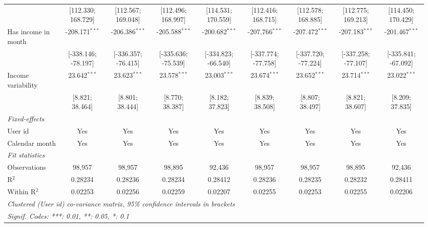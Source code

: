\begin{table}[htbp]
\begin{threeparttable}[b]
\begin{tabular}{lcccccccc}
                                          & [112.330; 168.729]  & [112.567; 169.048]  & [112.496; 168.997]  & [114.531; 170.559]  & [112.416; 168.715]  & [112.578; 168.885]  & [112.775; 169.213]  & [114.450; 170.429]\\   
         Has income in month              & -208.171$^{***}$    & -206.386$^{***}$    & -205.588$^{***}$    & -200.682$^{***}$    & -207.766$^{***}$    & -207.472$^{***}$    & -207.183$^{***}$    & -201.467$^{***}$\\   
                                          & [-338.146; -78.197] & [-336.357; -76.415] & [-335.636; -75.539] & [-334.823; -66.540] & [-337.774; -77.758] & [-337.720; -77.224] & [-337.258; -77.107] & [-335.841; -67.092]\\   
         Income variability               & 23.642$^{***}$      & 23.623$^{***}$      & 23.578$^{***}$      & 23.003$^{***}$      & 23.674$^{***}$      & 23.652$^{***}$      & 23.714$^{***}$      & 23.022$^{***}$\\   
                                          & [8.821; 38.464]     & [8.801; 38.444]     & [8.770; 38.387]     & [8.182; 37.823]     & [8.839; 38.508]     & [8.807; 38.497]     & [8.821; 38.607]     & [8.209; 37.835]\\   
         \midrule
         \emph{Fixed-effects}\\
         User id                          & Yes                 & Yes                 & Yes                 & Yes                 & Yes                 & Yes                 & Yes                 & Yes\\  
         Calendar month                   & Yes                 & Yes                 & Yes                 & Yes                 & Yes                 & Yes                 & Yes                 & Yes\\  
         \midrule
         \emph{Fit statistics}\\
         Observations                     & 98,957              & 98,957              & 98,895              & 92,436              & 98,957              & 98,957              & 98,895              & 92,436\\  
         R$^2$                            & 0.28234             & 0.28236             & 0.28234             & 0.28412             & 0.28236             & 0.28235             & 0.28232             & 0.28411\\  
         Within R$^2$                     & 0.02253             & 0.02256             & 0.02259             & 0.02207             & 0.02255             & 0.02253             & 0.02255             & 0.02206\\  
         \midrule \midrule
         \multicolumn{9}{l}{\emph{Clustered (User id) co-variance matrix, 95\% confidence intervals in brackets}}\\
         \multicolumn{9}{l}{\emph{Signif. Codes: ***: 0.01, **: 0.05, *: 0.1}}\\
      \end{tabular}
   \end{threeparttable}
\end{table}


